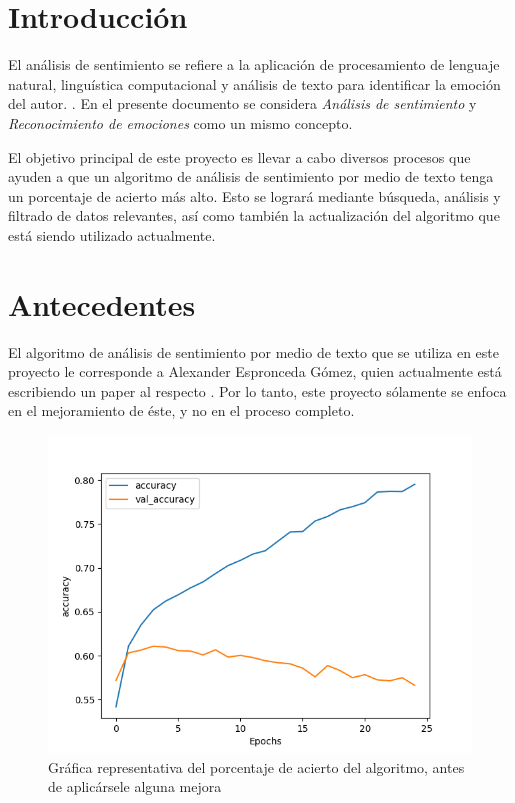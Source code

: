 \documentclass[a4]{sciposter}
\begin{document}
\begin{multicols}{2} 

\section{Introducción}
El análisis de sentimiento se refiere a la aplicación de procesamiento de lenguaje natural, linguística computacional y análisis de texto para identificar la emoción del autor. \citep{definition}. En el presente documento se considera \textit{Análisis de sentimiento} y \textit{Reconocimiento de emociones} como un mismo concepto.

El objetivo principal de este proyecto es llevar a cabo diversos procesos que ayuden a que un algoritmo de análisis de sentimiento por medio de texto tenga un porcentaje de acierto más alto. Esto se logrará mediante búsqueda, análisis y filtrado de datos relevantes, así como también la actualización del algoritmo que está siendo utilizado actualmente.

\section{Antecedentes}

El algoritmo de análisis de sentimiento por medio de texto que se utiliza en este proyecto le corresponde a Alexander Espronceda Gómez, quien actualmente está escribiendo un paper al respecto \citep{chatbot}. Por lo tanto, este proyecto sólamente se enfoca en el mejoramiento de éste, y no en el proceso completo.
\begin{figure}
	\centering
	\captionsetup{type=figure}
	\setcounter{figure}{0}
	\includegraphics[scale=1.3]{img/Accuracy 2020-05_nofilter}
	\caption{Gráfica representativa del porcentaje de acierto del algoritmo, antes de aplicársele alguna mejora}
	

\end{figure}
\end{multicols}
\end{document}
